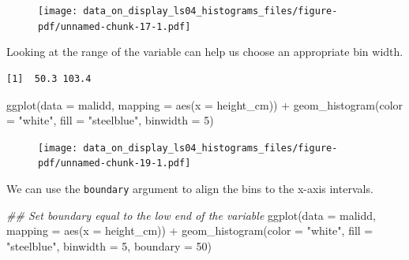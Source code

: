 \documentclass[
  letterpaper,
  DIV=11,
  numbers=noendperiod]{scrreprt}
\newenvironment{Shaded}{\begin{snugshade}}{\end{snugshade}}
\newcommand{\AttributeTok}[1]{\textcolor[rgb]{0.40,0.45,0.13}{#1}}
\newcommand{\DecValTok}[1]{\textcolor[rgb]{0.68,0.00,0.00}{#1}}
\newcommand{\DocumentationTok}[1]{\textcolor[rgb]{0.37,0.37,0.37}{\textit{#1}}}
\newcommand{\FunctionTok}[1]{\textcolor[rgb]{0.28,0.35,0.67}{#1}}
\newcommand{\NormalTok}[1]{\textcolor[rgb]{0.00,0.23,0.31}{#1}}
\newcommand{\SpecialCharTok}[1]{\textcolor[rgb]{0.37,0.37,0.37}{#1}}
\newcommand{\StringTok}[1]{\textcolor[rgb]{0.13,0.47,0.30}{#1}}
\begin{document}
\begin{figure}[H]

{\centering \texttt{[image: data\_on\_display\_ls04\_histograms\_files/figure-pdf/unnamed-chunk-17-1.pdf]}

}

\end{figure}

Looking at the range of the variable can help us choose an appropriate
bin width.

\begin{Shaded}
\end{Shaded}

\begin{verbatim}
[1]  50.3 103.4
\end{verbatim}

\begin{Shaded}
\begin{Highlighting}[]
\FunctionTok{ggplot}\NormalTok{(}\AttributeTok{data =}\NormalTok{  malidd, }
       \AttributeTok{mapping =} \FunctionTok{aes}\NormalTok{(}\AttributeTok{x =}\NormalTok{ height\_cm)) }\SpecialCharTok{+}
  \FunctionTok{geom\_histogram}\NormalTok{(}\AttributeTok{color =} \StringTok{"white"}\NormalTok{, }
                 \AttributeTok{fill =} \StringTok{"steelblue"}\NormalTok{, }
                 \AttributeTok{binwidth =} \DecValTok{5}\NormalTok{)}
\end{Highlighting}
\end{Shaded}

\begin{figure}[H]

{\centering \texttt{[image: data\_on\_display\_ls04\_histograms\_files/figure-pdf/unnamed-chunk-19-1.pdf]}

}

\end{figure}

We can use the \texttt{boundary} argument to align the bins to the
x-axis intervals.

\begin{Shaded}
\begin{Highlighting}[]
\DocumentationTok{\#\# Set \textasciigrave{}boundary\textasciigrave{} equal to the low end of the variable}
\FunctionTok{ggplot}\NormalTok{(}\AttributeTok{data =}\NormalTok{  malidd, }
       \AttributeTok{mapping =} \FunctionTok{aes}\NormalTok{(}\AttributeTok{x =}\NormalTok{ height\_cm)) }\SpecialCharTok{+}
  \FunctionTok{geom\_histogram}\NormalTok{(}\AttributeTok{color =} \StringTok{"white"}\NormalTok{, }
                 \AttributeTok{fill =} \StringTok{"steelblue"}\NormalTok{, }
                 \AttributeTok{binwidth =} \DecValTok{5}\NormalTok{,}
                 \AttributeTok{boundary =} \DecValTok{50}\NormalTok{)}
\end{Highlighting}
\end{Shaded}
\end{document}
